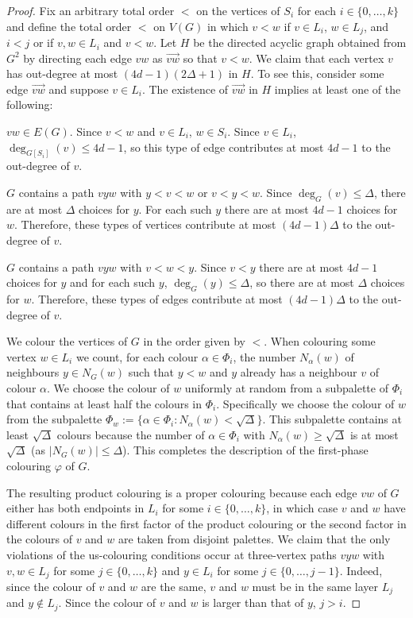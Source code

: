 \documentclass[kpfonts]{patmorin}
\begin{document}
\begin{proof}
  Fix an arbitrary total order $<$ on the vertices of $S_i$ for each $i\in\{0,\ldots,k\}$ and define the total order $<$ on $V(G)$ in which $v <w$ if $v\in L_i$, $w\in L_j$, and $i<j$ or if $v,w\in L_i$ and $v<w$.  Let $H$ be the directed acyclic graph obtained from $G^2$ by directing each edge $vw$ as $\overrightarrow{vw}$ so that $v<w$.  We claim that each vertex $v$ has out-degree at most $(4d-1)(2\Delta+1)$ in $H$.  To see this, consider some edge $\overrightarrow{vw}$ and suppose $v\in L_i$.  The existence of $\overrightarrow{vw}$ in $H$ implies at least one of the following:
  \begin{compactenum}
    \item $vw\in E(G)$.  Since $v<w$ and $v\in L_i$, $w\in S_i$.  Since $v\in L_i$, $\deg_{G[S_i]}(v)\le 4d-1$, so this type of edge contributes at most $4d-1$ to the out-degree of $v$.
    \item $G$ contains a path $vyw$ with $y < v < w$ or $v < y < w$.  Since $\deg_G(v)\le\Delta$, there are at most $\Delta$ choices for $y$.  For each such $y$ there are at most $4d-1$ choices for $w$.  Therefore, these types of vertices contribute at most $(4d-1)\Delta$ to the out-degree of $v$.
    \item $G$ contains a path $vyw$ with $v < w < y$.  Since $v<y$ there are at most $4d-1$ choices for $y$ and for each such $y$, $\deg_G(y)\le\Delta$, so there are at most $\Delta$ choices for $w$.  Therefore, these types of edges contribute at most $(4d-1)\Delta$ to the out-degree of $v$.
  \end{compactenum}
  We colour the vertices of $G$ in the order given by $<$.  When colouring some vertex $w\in L_i$ we count, for each colour $\alpha\in \Phi_i$, the number $N_\alpha(w)$ of neighbours $y\in N_G(w)$ such that $y < w$ and $y$ already has a neighbour $v$ of colour $\alpha$.  We choose the colour of $w$ uniformly at random from a subpalette of $\Phi_i$ that contains at least half the colours in $\Phi_i$.  Specifically we choose the colour of $w$ from the subpalette $\Phi_w:=\{\alpha\in\Phi_i: N_{\alpha}(w)<\sqrt{\Delta}\}$.  This subpalette contains at least $\sqrt{\Delta}$ colours because the number of $\alpha\in\Phi_i$ with $N_\alpha(w)\ge \sqrt{\Delta}$ is at most $\sqrt{\Delta}$ (as $|N_G(w)|\leq \Delta$).
  This completes the description of the first-phase colouring $\varphi$ of $G$.

  The resulting product colouring is a proper colouring because each edge $vw$ of $G$ either has both endpoints in $L_i$ for some $i\in\{0,\ldots,k\}$, in which case $v$ and $w$ have different colours in the first factor of the product colouring or the second factor in the colours of $v$ and $w$ are taken from disjoint palettes.  We claim that the only violations of the us-colouring conditions occur at three-vertex paths $vyw$ with $v,w\in L_j$ for some $j\in\{0,\ldots,k\}$ and $y\in L_i$ for some $j\in\{0,\ldots,j-1\}$. Indeed, since the colour of $v$ and $w$ are the same, $v$ and $w$ must be in the same layer $L_j$ and $y\not\in L_j$.  Since the colour of $v$ and $w$ is larger than that of $y$, $j> i$.


\end{proof}
\end{document}
